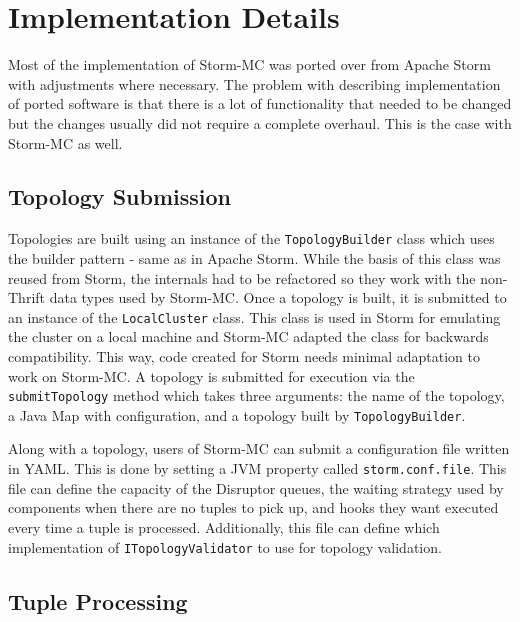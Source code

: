 \section{Implementation Details}
\label{sec:implementation}

Most of the implementation of Storm-MC was ported over from Apache Storm with adjustments where necessary. The problem with describing implementation of ported software is that there is a lot of functionality that needed to be changed but the changes usually did not require a complete overhaul. This is the case with Storm-MC as well.

\subsection{Topology Submission}

Topologies are built using an instance of the \texttt{TopologyBuilder} class which uses the builder pattern - same as in Apache Storm. While the basis  of this class was reused from Storm, the internals had to be refactored so they work with the non-Thrift data types used by Storm-MC. Once a topology is built, it is submitted to an instance of the \texttt{LocalCluster} class. This class is used in Storm for emulating the cluster on a local machine and Storm-MC adapted the class for backwards compatibility. This way, code created for Storm needs minimal adaptation to work on Storm-MC. A topology is submitted for execution via the \texttt{submitTopology} method which takes three arguments: the name of the topology, a Java Map with configuration, and a topology built by \texttt{TopologyBuilder}.

Along with a topology, users of Storm-MC can submit a configuration file written in YAML. This is done by setting a JVM property called \texttt{storm.conf.file}. This file can define the capacity of the Disruptor queues, the waiting strategy used by components when there are no tuples to pick up, and hooks they want executed every time a tuple is processed. Additionally, this file can define which implementation of \texttt{ITopologyValidator} to use for topology validation.

\subsection{Tuple Processing}

